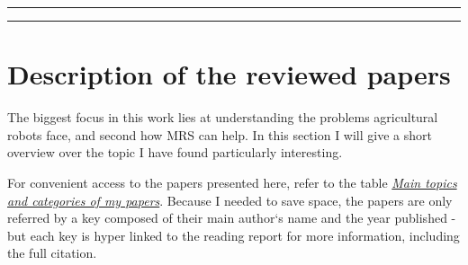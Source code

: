         \vspace{10px}
        \hrule
        \vspace{10px}


        \vspace{10px}
        \hrule
        \vspace{10px}



    \chapter{Description of the reviewed papers}

    The biggest focus in this work lies at understanding the problems agricultural robots face, and second how MRS can help. In this section I will give a short overview over the topic I have found particularly interesting. 
    
    For convenient access to the papers presented here, refer to the table \hyperref[table:main_topics]{\emph{Main topics and categories of my papers}}. Because I needed to save space, the papers are only referred by a key composed of their main author`s name and the year published - but each key is hyper linked to the reading report for more information, including the full citation.

